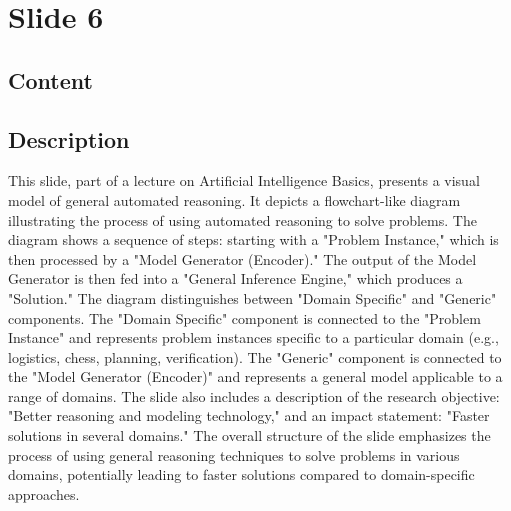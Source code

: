 \documentclass{article}%
\begin{document}
%
\newpage%
\section{Slide 6}%
\label{sec:Slide6}%
\subsection{Content}%
%
\subsection{Description}%
This slide, part of a lecture on Artificial Intelligence Basics, presents a visual model of general automated reasoning.  It depicts a flowchart-like diagram illustrating the process of using automated reasoning to solve problems.  The diagram shows a sequence of steps: starting with a "Problem Instance," which is then processed by a "Model Generator (Encoder)."  The output of the Model Generator is then fed into a "General Inference Engine," which produces a "Solution."  The diagram distinguishes between "Domain Specific" and "Generic" components.  The "Domain Specific" component is connected to the "Problem Instance" and represents problem instances specific to a particular domain (e.g., logistics, chess, planning, verification).  The "Generic" component is connected to the "Model Generator (Encoder)" and represents a general model applicable to a range of domains.  The slide also includes a description of the research objective: "Better reasoning and modeling technology," and an impact statement: "Faster solutions in several domains."  The overall structure of the slide emphasizes the process of using general reasoning techniques to solve problems in various domains, potentially leading to faster solutions compared to domain-specific approaches.%
\end{document}
